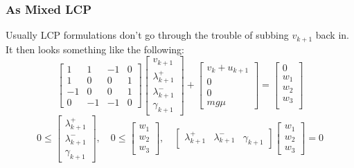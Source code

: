 \documentclass{article}
\begin{document}
\subsubsection{As Mixed LCP}
Usually LCP formulations don't go through the trouble of subbing $v_{k+1}$ back in. It then looks something like the following:
\[
    \begin{bmatrix}
        1 & 1 & -1 & 0 \\
        1 & 0 & 0 & 1\\
        -1 & 0 & 0 & 1 \\
        0 & -1 & -1 & 0
    \end{bmatrix}
    \begin{bmatrix}
        v_{k+1} \\
        \lambda^+_{k+1} \\
        \lambda^-_{k+1} \\
        \gamma_{k+1}
    \end{bmatrix}
    +
    \begin{bmatrix}
        v_k + u_{k+1} \\
        0 \\
        0 \\
        m g \mu
    \end{bmatrix}
    =
    \begin{bmatrix}
        0 \\
        w_1 \\
        w_2 \\
        w_3 \\
    \end{bmatrix}
\]
\[
    0 \leq 
    \begin{bmatrix}
        \lambda^+_{k+1} \\
        \lambda^-_{k+1} \\
        \gamma_{k+1}
    \end{bmatrix}, \quad
    0 \leq 
    \begin{bmatrix}
        w_1 \\
        w_2 \\
        w_3
    \end{bmatrix}, \quad
    \begin{bmatrix}
        \lambda^+_{k+1} &
        \lambda^-_{k+1} &
        \gamma_{k+1}
    \end{bmatrix}
    \begin{bmatrix}
        w_1 \\
        w_2 \\
        w_3
    \end{bmatrix}
    = 0
\]
\end{document}
